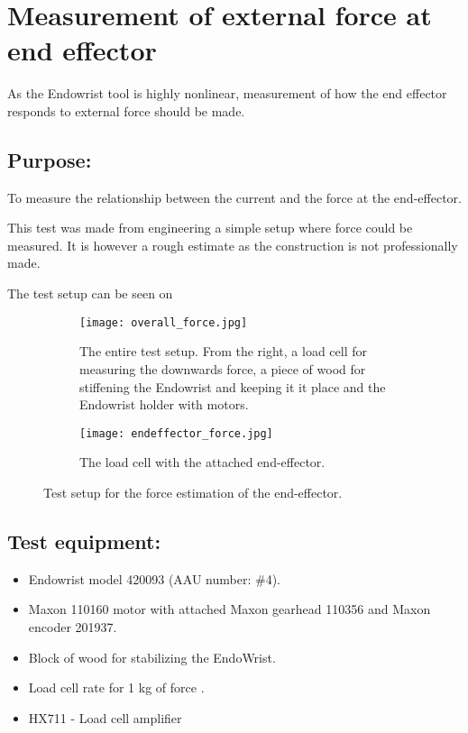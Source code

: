 \section{Measurement of external force at end effector} %

As the Endowrist tool is highly nonlinear, measurement of how the end effector responds to external force should be made.

\subsection*{Purpose:}
To measure the relationship between the current and the force at the end-effector.

This test was made from engineering a simple setup where force could be measured. It is however a rough estimate as the construction is not professionally made. 

The test setup can be seen on  

\begin{figure}[H]
	\centering
	\begin{subfigure}{.45\textwidth}
		\centering
		\vspace{24pt}
		\texttt{[image: overall\_force.jpg]}
		\caption{The entire test setup. From the right, a load cell for measuring the downwards force, a piece of wood for stiffening the Endowrist and keeping it it place and the Endowrist holder with motors.}
		\label{fig:entire_force_testsetup}
	\end{subfigure}
	\begin{subfigure}{.45\textwidth}
		\centering
		\texttt{[image: endeffector\_force.jpg]}
		\caption{The load cell with the attached end-effector.}
		\label{fig:endeffector_force}
	\end{subfigure}
\caption{Test setup for the force estimation of the end-effector.}
\label{fig:Overview_force}
\end{figure}

\subsection*{Test equipment:}
\begin{itemize}
\item Endowrist model 420093 (AAU number: \#4).
\item Maxon 110160 motor with attached Maxon gearhead 110356 and Maxon encoder 201937.
\item Block of wood for stabilizing the EndoWrist.
\item Load cell rate for 1 kg of force \cite{Load_cell_1kg}.
\item HX711 - Load cell amplifier \cite{HX711}
\end{itemize}

